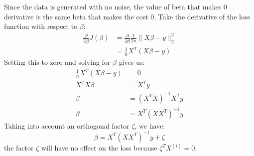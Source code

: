 \begin{answer}
    Since the data is generated with no noise, the value of beta that makes 0 derivative
    is the same beta that makes the cost 0.
    Take the derivative of the loss function with respect to $\beta$:
    \begin{align*}
        \frac{\partial}{\partial \beta} J(\beta) &= \frac{\partial}{\partial \beta} \frac{1}{2n} \|X\beta - y\|^2_2 \\
        &= \frac{1}{n} X^T (X\beta - y)
    \end{align*}
    Setting this to zero and solving for $\beta$ gives us:
    \begin{align*}
        \frac{1}{n} X^T (X\beta - y) &= 0 \\
        X^T X \beta &= X^T y \\
        \beta &= (X^T X)^{-1} X^T y \\
        \beta &= X^T (X X^T)^{-1} y
    \end{align*}
    Taking into account an orthogonal factor $\zeta$, we have:
    $$
    \beta = X^T (X X^T)^{-1} y + \zeta
    $$
    the factor $\zeta$ will have no effect on the loss because $\zeta^T X^{(i)} = 0$.
\end{answer}

